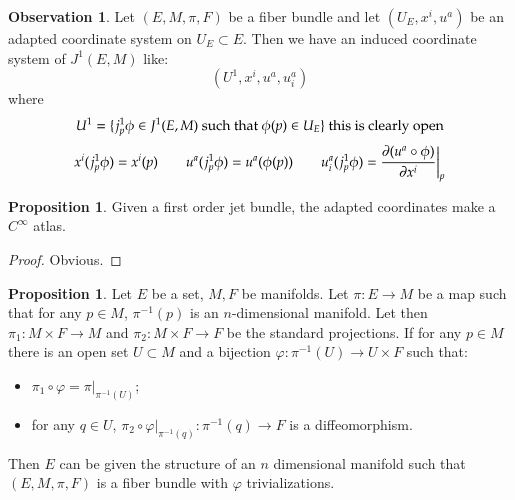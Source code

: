 \documentclass[12pt,a4paper]{report}
\theoremstyle{definition}
\theoremstyle{Theorem}
\newtheorem{Prop}[Def]{Proposition}
\theoremstyle{break}
\theoremstyle{definition}
\newtheorem{Obs}[Def]{Observation}
\begin{document}
	\begin{Obs}
		Let $(E,M,\pi,F)$ be a fiber bundle and let $(U_E,x^i,u^a)$ be an adapted coordinate system on $U_E\subset E$. Then we have an induced coordinate system of $J^1(E,M)$ like:
		$$(U^1,x^i,u^a,u^a_i)$$
		where
		$$U^1=\{j^1_p\phi\in J^1(E,M)\hbox{ such that }\phi(p)\in U_E\} \hbox{ this is clearly open}$$
		$$x^i(j^1_p\phi)=x^i(p)\hspace{20 pt}u^a(j^1_p\phi)=u^a(\phi(p))\hspace{20 pt}u^a_i(j^1_p\phi)={\partial (u^a\circ \phi)\over \partial x^i}\bigg|_p$$
	\end{Obs}
	\begin{Prop}
		Given a first order jet bundle, the adapted coordinates make a $C^\infty$ atlas.
	\end{Prop}
	\begin{proof}
		Obvious.
	\end{proof}
	\begin{Prop}
		Let $E$ be a set, $M,F$ be manifolds. Let $\pi:E\rightarrow M$ be a map such that for any $p\in M$, $\pi^{-1}(p)$ is an $n$-dimensional manifold. Let then $\pi_1:M\times F\rightarrow M$ and $\pi_2:M\times F\rightarrow F$ be the standard projections. If for any $p\in M$ there is an open set $U\subset M$ and a bijection $\varphi:\pi^{-1}(U)\rightarrow U\times F$ such that:
		\begin{itemize}
			\item $\pi_1\circ \varphi=\pi\big|_{\pi^{-1}(U)}$;
			\item for any $q\in U$, $\pi_2\circ \varphi\big|_{\pi^{-1}(q)}:\pi^{-1}(q)\rightarrow F$ is a diffeomorphism.
		\end{itemize}
		Then $E$ can be given the structure of an $n$ dimensional manifold such that $(E,M,\pi,F)$ is a fiber bundle with $\varphi$ trivializations.
	\end{Prop}
\end{document}
